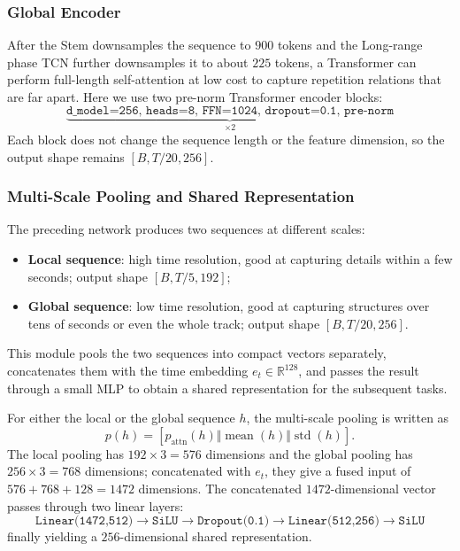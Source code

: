\documentclass{article}
\begin{document}
\subsubsection{Global Encoder}

After the Stem downsamples the sequence to $900$ tokens and the Long-range phase TCN further downsamples it to about $225$ tokens, a Transformer can perform full-length self-attention at low cost to capture repetition relations that are far apart. Here we use two pre-norm Transformer encoder blocks:
\[\underbrace{\texttt{d\_model=256, heads=8, FFN=1024, dropout=0.1, pre-norm}}_{\times 2}\]
Each block does not change the sequence length or the feature dimension, so the output shape remains $[B, T/20, 256]$.

\subsubsection{Multi-Scale Pooling and Shared Representation}

The preceding network produces two sequences at different scales:
\begin{itemize}
    \item \textbf{Local sequence}: high time resolution, good at capturing details within a few seconds; output shape $[B, T/5, 192]$;
    \item \textbf{Global sequence}: low time resolution, good at capturing structures over tens of seconds or even the whole track; output shape $[B, T/20, 256]$.
\end{itemize}
This module pools the two sequences into compact vectors separately, concatenates them with the time embedding $e_t \in \mathbb{R}^{128}$, and passes the result through a small MLP to obtain a shared representation for the subsequent tasks.

For either the local or the global sequence $h$, the multi-scale pooling is written as
\begin{equation}
p(h)=\left[p_{\mathrm{attn}}(h)\Vert\operatorname{mean}(h)
\Vert\operatorname{std}(h)\right].
\end{equation}
The local pooling has $192\times3=576$ dimensions and the global pooling has $256\times3=768$ dimensions; concatenated with $e_t$, they give a fused input of $576+768+128=1472$ dimensions. The concatenated $1472$-dimensional vector passes through two linear layers:
\[\texttt{Linear(1472,512)} \to \texttt{SiLU} \to \texttt{Dropout(0.1)} \to \texttt{Linear(512,256)} \to \texttt{SiLU}\]
finally yielding a $256$-dimensional shared representation.
\end{document}
